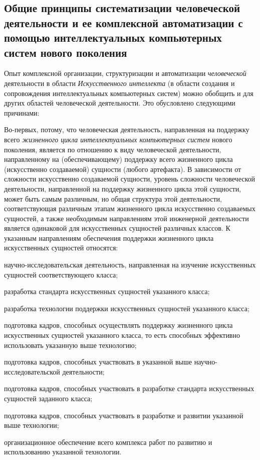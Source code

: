 \subsection{Общие принципы систематизации человеческой деятельности и ее комплексной автоматизации с помощью интеллектуальных компьютерных систем нового поколения}
\label{subsec_general_principles_systematization_human_activity_and_its_complex_automation_help_ICS}

Опыт комплексной организации, структуризации и автоматизации \textit{человеческой} деятельности в области \textit{Искусственного интеллекта} (в области создания и сопровождения интеллектуальных компьютерных систем) можно обобщить и для других областей человеческой деятельности. Это обусловлено следующими причинами:

\begin{textitemize}
	\item
	Во-первых, потому, что человеческая деятельность, направленная на поддержку всего \textit{жизненного цикла интеллектуальных компьютерных систем} нового поколения, является   по отношению к виду человеческой деятельности, направленному на (обеспечивающему) поддержку всего жизненного цикла  (искусственно создаваемой) сущности (любого артефакта). В зависимости от сложности искусственно создаваемой сущности, уровень сложности человеческой деятельности, направленной на поддержку жизненного цикла этой сущности, может быть самым различным, но общая структура этой деятельности, соответствующая различным этапам жизненного цикла искусственно создаваемых сущностей, а также необходимым направлениям  этой инженерной деятельности является одинаковой для искусственных сущностей различных классов. К указанным направлениям обеспечения поддержки жизненного цикла искусственных сущностей относятся:
	\begin{textitemize}
		\item научно-исследовательская деятельность, направленная на изучение искусственных сущностей соответствующего класса;
		\item разработка стандарта искусственных сущностей указанного класса;
		\item разработка технологии поддержки искусственных сущностей указанного класса;
		\item подготовка кадров, способных осуществлять поддержку жизненного цикла искусственных сущностей указанного класса, то есть способных эффективно использовать указанную выше технологию;
		\item подготовка кадров, способных участвовать в указанной выше научно-исследовательской деятельности;
		\item подготовка кадров, способных участвовать в разработке стандарта искусственных сущностей заданного класса;
		\item подготовка кадров, способных участвовать в разработке и развитии указанной выше технологии;
		\item организационное обеспечение всего комплекса работ по развитию и использованию указанной технологии.
	\end{textitemize}
	

\end{textitemize}
